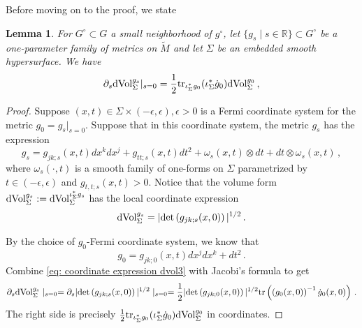 \documentclass[11pt]{amsart}
\newtheorem{Lemma}[Theorem]{Lemma}
\theoremstyle{definition}
\numberwithin{equation}{section}
\begin{document}
Before moving on to the proof, we state
\begin{Lemma}
\label{lem: differential of volume form}
For $G^\circ \subset G$ a small neighborhood of $g^\circ$, let $\{g_s\mid s\in \mathbb R\} \subset G^\circ$ be a one-parameter family of metrics on $\widetilde{M}$ and let $\Sigma$ be an embedded smooth hypersurface. 
We have %
\begin{eqnarray}\nonumber
\partial_s {\rm dVol}^{g_s}_{\Sigma} \vert_{s= 0} %
=  \frac{1}{2} \mathrm{tr}_{\iota_{\Sigma}^*g_0}( \iota_{\Sigma}^*\dot {g}_0) {\rm dVol}^{g_0}_{\Sigma}\,,
\end{eqnarray}
\end{Lemma}
\begin{proof}
Suppose $(x,t)\in \Sigma\times (-\epsilon, \epsilon), \epsilon>0$ is a Fermi coordinate system for the metric $g_0 = g_s\vert_{s=0}$. %
Suppose that in this coordinate system, the metric $g_s$ has the expression
$$g_s = g_{jk;s}(x,t) dx^k dx^j + g_{tt;s}(x,t) dt^2 + \omega_s(x,t) \otimes dt  + dt\otimes \omega_s(x,t)\,,$$
where $\omega_s(\cdot, t)$ is a smooth family of one-forms on $\Sigma$ parametrized by $t\in (-\epsilon,\epsilon)$ and $g_{t,t;s}(x,t) > 0$.
Notice that the volume form ${\rm dVol}^{g_s}_{\Sigma} :={\rm dVol}^{\iota_{\Sigma}^*g_s}_{\Sigma}$ has the local coordinate expression
\begin{equation}
\label{eq: coordinate expression dvol3}
{\rm dVol}^{g_s}_{\Sigma} =|{\rm det}\left(g_{jk;s}(x,0)\right)|^{1/2}\,.
\end{equation}

By the choice of $g_0$-Fermi coordinate system, we know that 
$$g_0  = g_{jk;0}(x,t) dx^jdx^k + dt^2\,.$$
Combine \eqref{eq: coordinate expression dvol3} with Jacobi's formula to get
$$\partial_s{\rm dVol}^{g_s}_{\Sigma} \mid_{s=0}=\partial_s|{\rm det}\left(g_{jk;s}(x,0)\right)|^{1/2}\mid_{s=0} =\frac{1}{2} |{\rm det}\left(g_{jk;0}(x,0)\right)|^{1/2}{\rm tr} \left(\left(g_0(x,0)\right)^{-1} \dot g_{0}(x,0)\right) \,.$$
The right side is precisely $\frac{1}{2} \mathrm{tr}_{\iota_{\Sigma}^*g_0}(\iota_{\Sigma}^*\dot {g}_0) {\rm dVol}^{g_0}_{\Sigma}$ in coordinates.
\end{proof}
\end{document}
